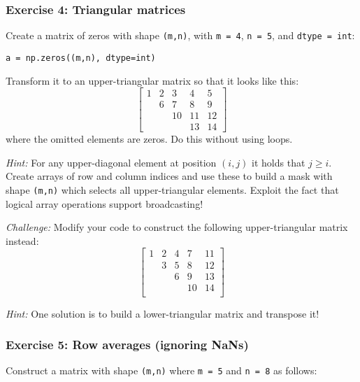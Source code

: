 \documentclass[10pt]{scrartcl}
\begin{document}
    \hypertarget{exercise-4-triangular-matrices}{%
\subsubsection{Exercise 4: Triangular
matrices}\label{exercise-4-triangular-matrices}}

Create a matrix of zeros with shape \texttt{(m,n)}, with
\texttt{m\ =\ 4}, \texttt{n\ =\ 5}, and \texttt{dtype\ =\ int}:

\begin{verbatim}
a = np.zeros((m,n), dtype=int)
\end{verbatim}

Transform it to an upper-triangular matrix so that it looks like this:
\[
\begin{bmatrix}
1 & 2 & 3 & 4 & 5 \\
 & 6 & 7 & 8 & 9 \\
  & & 10 & 11 & 12 \\
  & & & 13 & 14
\end{bmatrix}
\] where the omitted elements are zeros. Do this without using loops.

\emph{Hint:} For any upper-diagonal element at position \((i,j)\) it
holds that \(j \geq i\). Create arrays of row and column indices and use
these to build a mask with shape \texttt{(m,n)} which selects all
upper-triangular elements. Exploit the fact that logical array
operations support broadcasting!

\emph{Challenge:} Modify your code to construct the following
upper-triangular matrix instead: \[
\begin{bmatrix}
1 & 2 & 4 & 7 & 11 \\
  & 3 & 5 & 8 & 12 \\
  &   & 6 & 9 & 13 \\
  &   &   & 10 & 14 \\
\end{bmatrix}
\]

\emph{Hint:} One solution is to build a lower-triangular matrix and
transpose it!

    \hypertarget{exercise-5-row-averages-ignoring-nans}{%
\subsubsection{Exercise 5: Row averages (ignoring
NaNs)}\label{exercise-5-row-averages-ignoring-nans}}

Construct a matrix with shape \texttt{(m,n)} where \texttt{m\ =\ 5} and
\texttt{n\ =\ 8} as follows:
\end{document}
